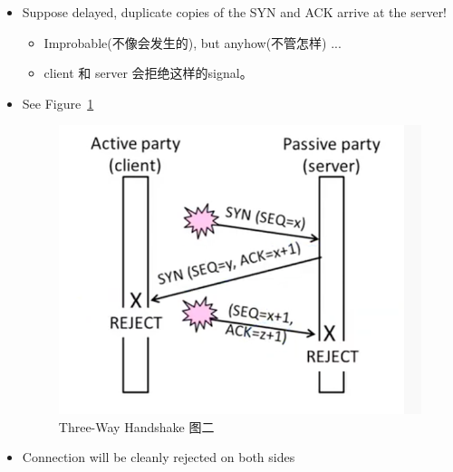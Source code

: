 \documentclass[12pt]{ctexart}   %
\begin{document}
\begin{itemize}
		 \item Suppose delayed, duplicate copies of the SYN and ACK arrive at the server!
		 \begin{itemize}
		 	\item Improbable(不像会发生的), but anyhow(不管怎样) ...
		 	\item client 和 server 会拒绝这样的signal。
		 \end{itemize}
		 \item See Figure~\ref{fig:6-3-3}
		 
		 \begin{figure}[h!] %
		\centering
		 \includegraphics[scale=0.7]{images/6-3-3}
		\caption{ Three-Way Handshake 图二 }
		 \label{fig:6-3-3}
		 \end{figure}

		 \item Connection will be cleanly rejected on both sides
	\end{itemize}
	
\end{document}
